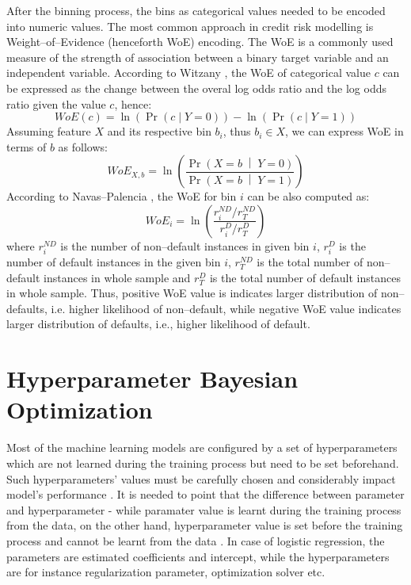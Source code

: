After the binning process, the bins as categorical values needed to be encoded into numeric values. The most common approach in credit risk modelling is Weight--of--Evidence (henceforth WoE) encoding. The WoE is a commonly used measure of the strength of association between a binary target variable and an independent variable.
According to Witzany \citep{witzany2017credit}, the WoE of categorical value $c$ can be expressed as the change between the overal log odds ratio and the log odds ratio given the value $c$, hence:
\begin{equation}\label{eq}
    WoE\left(c\right) = \ln\left(\operatorname{Pr}\left(c \mid Y = 0 \right) \right) - \ln\left(\operatorname{Pr}\left(c \mid Y = 1 \right) \right)
\end{equation}
Assuming feature $X$ and its respective bin $b_i$, thus $b_i \in X$, we can express WoE in terms of $b$ as follows:
\begin{equation}\label{eq}
    WoE_{X, b}= \ln \left(\frac{\Pr{\left(X = b\;\middle|\;Y = 0\right)}}{\Pr{\left(X = b\;\middle|\;Y = 1\right)}}\right)
\end{equation}
According to Navas--Palencia \citep{navas2020optimal}, the WoE for bin $i$ can be also computed as:
\begin{equation}\label{eq}
    WoE_{i} = \ln \left( \frac{r^{ND}_i / r^{ND}_T} {r^{D}_i / r^{D}_T}  \right)
\end{equation}
where $r^{ND}_i$ is the number of non--default instances in given bin $i$, $r^{D}_i$ is the number of default instances in the given bin $i$, $r^{ND}_T$ is the total number of non--default instances in whole sample and $r^{D}_T$ is the total number of default instances in whole sample.
Thus, positive WoE value is indicates larger distribution of non--defaults, i.e. higher likelihood of non--default, while negative WoE value indicates larger distribution of defaults, i.e., higher likelihood of default.

\section{Hyperparameter Bayesian Optimization}
\label{sec:bayesoptheory}
Most of the machine learning models are configured by a set of hyperparameters which are not learned during the training process but need to be set beforehand. Such hyperparameters' values must be carefully chosen and considerably impact model's performance \citep{bischl2023hyperparameter}.
It is needed to point that the difference between parameter and hyperparameter - while paramater value is learnt during the training process from the data, on the other hand, hyperparameter value is set before the training process and cannot be learnt from the data \citep{owen2022hyperparameter}. In case of logistic regression, the parameters are estimated coefficients and intercept, while the hyperparameters are for instance regularization parameter, optimization solver etc.

